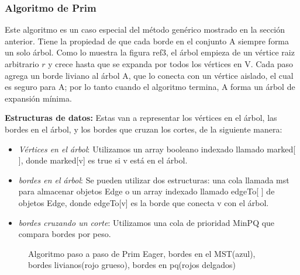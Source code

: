 \documentclass[a4paper, 11pt]{report}
\newcommand{\DrawEJcGraph}[5]{

    \begin{scope}[#5]
    \foreach \pos/\nodo in {{(0,0)/4}, {(0,1.8)/5}, {(1.1,1.3)/7}, {(2.6,2.6)/1}, {(2.6,0.6)/0}, {(4.1,1.3)/2}, {(4.1,2.6)/3}, {(6.6,0)/6}}
        \node[vertex] (#3\nodo) at \pos {\nodo};
    \foreach \start/\end in {4/5, 5/7, 7/1,7/0,0/2,2/3,2/6,4/7,1/5,0/4,1/2,1/3,2/7,3/6,6/0,6/4}
        \path[edge,#5] (#3\start) -- (#3\end);

    \foreach \nodo in {#1}
        \node[selected vertex] at (#3\nodo) {\nodo};

    \begin{pgfonlayer}{background}%
        \foreach \start/\end in {#2}
            \path[rojod edge,#5] (#3\start) -- (#3\end);
    \end{pgfonlayer}
    \begin{pgfonlayer}{background}%
        \foreach \start/\end in {#3}
            \path[rojog edge,#5] (#3\start) -- (#3\end);
    \end{pgfonlayer}
    \begin{pgfonlayer}{background}%
        \foreach \start/\end in {#4}
            \path[azul edge,#5] (#3\start) -- (#3\end);
    \end{pgfonlayer}
    \end{scope}

}
\begin{document}
\subsubsection{Algoritmo de Prim}

Este algoritmo es un caso especial del método genérico mostrado en la sección anterior. Tiene la propiedad de que cada borde en el conjunto A siempre forma un solo árbol. Como lo muestra la figura ref3, el árbol empieza de un vértice raiz arbitrario $r$ y crece hasta que se expanda por todos los vértices en V. Cada paso agrega un borde liviano al árbol A, que lo conecta con un vértice aislado, el cual es seguro para A; por lo tanto cuando el algoritmo termina, A forma un árbol de expansión mínima. 

\textbf{Estructuras de datos:} Estas van a representar los vértices en el árbol, las bordes en el árbol, y los bordes que cruzan los cortes, de la siguiente manera:
\begin{itemize}
\item \textit{Vértices en el árbol}: Utilizamos un array booleano indexado llamado marked[ ], donde marked[v] es true si v está en el árbol.
\item \textit{bordes en el árbol}: Se pueden utilizar dos estructuras: una cola llamada mst para almacenar objetos Edge o un array indexado llamado edgeTo[ ] de objetos Edge, donde edgeTo[v] es la borde que conecta v con el árbol.
\item \textit{bordes cruzando un corte}: Utilizamos una cola de prioridad MinPQ que compara bordes por peso.  
\end{itemize}

\begin{figure}[!h]
    \caption{Algoritmo paso a paso de Prim Eager, bordes en el MST(azul), bordes livianos(rojo grueso), bordes en pq(rojos delgados)}
    \label{MST4}
\end{figure}
\end{document}

